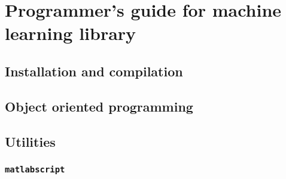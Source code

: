 
\chapter{Programmer's guide for machine learning library}

\section{Installation and compilation}

\section{Object oriented programming}

\section{Utilities}

\subsection{{\tt matlabscript}}


